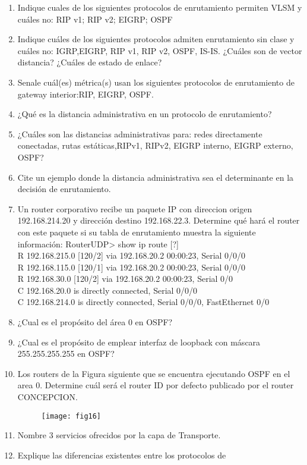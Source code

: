 \documentclass{udparticle}
\begin{document}
\begin{enumerate}
\item Indique cuales de los siguientes protocolos de enrutamiento permiten VLSM y 
cuáles no: RIP v1; RIP v2; EIGRP; OSPF
\item Indique cuáles de los siguientes protocolos admiten enrutamiento sin clase y 
cuáles no: IGRP,EIGRP, RIP v1, RIP v2, OSPF, IS-IS. ¿Cuáles son de vector 
distancia? ¿Cuáles de estado de enlace?
\item Senale cuál(es) métrica(s) usan los siguientes protocolos de enrutamiento de gateway interior:RIP, EIGRP, OSPF.
\item ¿Qué es la distancia administrativa en un protocolo de enrutamiento?
\item ¿Cuáles son las distancias administrativas para: redes directamente conectadas, rutas estáticas,RIPv1, RIPv2, EIGRP interno, EIGRP externo, OSPF?
\item Cite un ejemplo donde la distancia administrativa sea el determinante en la decisión de enrutamiento.
\item Un router corporativo recibe un paquete IP con direccion origen 
192.168.214.20 y dirección destino 192.168.22.3. Determine qué hará el router con este paquete si su tabla de enrutamiento muestra la
siguiente información: 
RouterUDP> show ip route [?]\\
R 192.168.215.0 [120/2] via 192.168.20.2 00:00:23, Serial 0/0/0\\
R 192.168.115.0 [120/1] via 192.168.20.2 00:00:23, Serial 0/0/0\\
R 192.168.30.0 [120/2] via 192.168.20.2 00:00:23, Serial 0/0\\
C 192.168.20.0 is directly connected, Serial 0/0/0\\
C 192.168.214.0 is directly connected, Serial 0/0/0, FastEthernet 0/0\\
\item ¿Cual es el propósito del área 0 en OSPF?
\item ¿Cual es el propósito de emplear interfaz de loopback con máscara
255.255.255.255 en OSPF?
\item Los routers de la Figura siguiente que  se encuentra ejecutando OSPF en el 
area 0. 
Determine cuál será el router ID por defecto publicado por el router 
CONCEPCION.
	\begin{figure}[H]
	\centering
	\texttt{[image: fig16]}
	\end{figure}
\item Nombre 3 servicios ofrecidos por la capa de Transporte.
\item Explique las diferencias existentes entre los protocolos de 

\end{enumerate}
\end{document}
